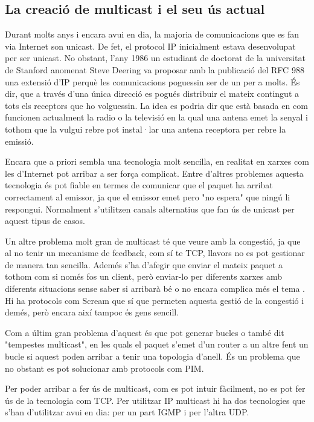 \subsection{La creació de multicast i el seu ús actual}
{
    Durant molts anys i encara avui en dia, la majoria de comunicacions que es fan via Internet son unicast. De fet, el protocol IP 
    inicialment estava desenvolupat per ser unicast. No obstant, l'any 1986 un estudiant de doctorat de la universitat de Stanford 
    anomenat Steve Deering va proposar amb la publicació del RFC 988 una extensió d'IP perquè les comunicacions poguessin ser de un 
    per a molts. És dir, que a través d'una única direcció es pogués distribuir el mateix contingut a tots els receptors que ho
    volguessin. La idea es podria dir que està basada en com funcionen actualment la radio o la televisió en la qual una antena emet
    la senyal i tothom que la vulgui rebre pot instal·lar una antena receptora per rebre la emissió.

    Encara que a priori sembla una tecnologia molt sencilla, en realitat en xarxes com les d'Internet pot arribar a ser força complicat.
    Entre d'altres problemes aquesta tecnologia és pot fiable en termes de comunicar que el paquet ha arribat correctament al emissor, ja
    que el emissor emet pero "no espera" que ningú li respongui. Normalment s'utilitzen canals alternatius que fan ús de unicast per aquest
    tipus de casos.
    
    Un altre problema molt gran de multicast té que veure amb la congestió, ja que al no tenir un mecanisme de feedback, com sí te TCP, llavors
    no es pot gestionar de manera tan sencilla. Ademés s'ha d'afegir que enviar el mateix paquet a tothom com si només fos un client,
    però enviar-lo per diferents xarxes amb diferents situacions sense saber si arribarà bé o no encara complica més el tema . Hi ha protocols
    com Scream que sí que permeten aquesta gestió de la congestió i demés, però encara així tampoc és gens sencill.

    Com a últim gran problema d'aquest és que pot generar bucles o també dit "tempestes multicast", en les quals el paquet s'emet d'un router a un altre
    fent un bucle si aquest poden arribar a tenir una topologia d'anell. És un problema que no obstant es pot solucionar amb protocols com \ac{PIM}.

    Per poder arribar a fer ús de multicast, com es pot intuir fàcilment, no es pot fer ús de la tecnologia com TCP. Per utilitzar IP multicast hi ha
    dos tecnologies que s'han d'utilitzar avui en dia: per un part IGMP i per l'altra UDP.
}

